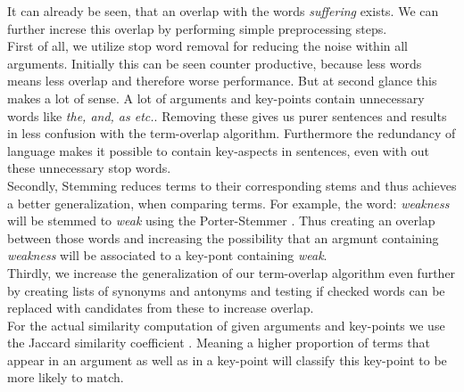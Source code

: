 It can already be seen, that an overlap with the words \textit{suffering} exists. 
We can further increse this overlap by performing simple preprocessing steps.\\
First of all, we utilize stop word removal for reducing the noise within all arguments. Initially this can be seen 
counter productive, because less words means less overlap and therefore worse performance. But at second glance this 
makes a lot of sense. A lot of arguments and key-points contain unnecessary words like \textit{the, and, as etc.}.
Removing these gives us purer sentences and results in less confusion with the term-overlap algorithm. Furthermore the 
redundancy of language makes it possible to contain key-aspects in sentences, even with out these unnecessary stop words.\\
Secondly, Stemming reduces terms to their corresponding stems and thus achieves a better generalization, 
when comparing terms. For example, the word: \textit{weakness} will be stemmed to \textit{weak} using the Porter-Stemmer 
\cite{Porter1980}. Thus creating an overlap between those words and increasing the possibility that an argmunt containing
\textit{weakness} will be associated to a key-pont containing \textit{weak}.\\
Thirdly, we increase the generalization of our term-overlap algorithm even further by creating lists of synonyms and 
antonyms and testing if checked words can be replaced with candidates from these to increase overlap.\\
For the actual similarity computation of given arguments and key-points we use the Jaccard similarity coefficient 
\cite{Jaccard1902}. Meaning a higher proportion of terms that appear in an argument as well as in a key-point will 
classify this key-point to be more likely to match.



